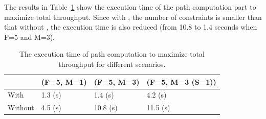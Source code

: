 




The results in Table~\ref{table:eval1} show the execution time of the path computation part to maximize total throughput. Since with \concept{}, the number of constraints is smaller than that without \concept{}, the execution time is also reduced (from 10.8 to 1.4 seconds when F=5 and M=3). 


\begin{table}[]
\footnotesize
\begin{tabular}{|l|l|l|l|}
\hline
             & \footnotesize(F=5, M=1) & \footnotesize (F=5, M=3) & \footnotesize (F=5, M=3 (S=1)) \\ \hline
With \concept{}    & 1.3 (s)    & 1.4 (s)    & 4.2 (s)          \\ \hline
Without \concept{} & 4.5 (s)    & 10.8 (s)   & 11.5 (s)         \\ \hline
\end{tabular}
\caption{\small The execution time of path computation to maximize total throughput for different scenarios.}
\label{table:eval1}
\end{table}


